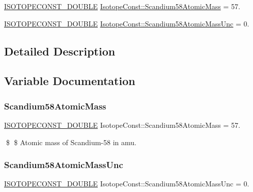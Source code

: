 \begin{DoxyCompactItemize}
\item 
\mbox{\hyperlink{group___isotope_const-_macros_ga8f45a7272ce02c0b4c65c44636ed719a}{I\+S\+O\+T\+O\+P\+E\+C\+O\+N\+S\+T\+\_\+\+D\+O\+U\+B\+LE}} \mbox{\hyperlink{group___isotope_const-_scandium-_sc58_ga1dbbfe5cc5ccc814f29a03872e4cf529}{Isotope\+Const\+::\+Scandium58\+Atomic\+Mass}} = 57.
\item 
\mbox{\hyperlink{group___isotope_const-_macros_ga8f45a7272ce02c0b4c65c44636ed719a}{I\+S\+O\+T\+O\+P\+E\+C\+O\+N\+S\+T\+\_\+\+D\+O\+U\+B\+LE}} \mbox{\hyperlink{group___isotope_const-_scandium-_sc58_ga3806395cabb2aea7ebae7f1a0381dda7}{Isotope\+Const\+::\+Scandium58\+Atomic\+Mass\+Unc}} = 0.
\end{DoxyCompactItemize}


\subsection{Detailed Description}


\subsection{Variable Documentation}
\mbox{\label{group___isotope_const-_scandium-_sc58_ga1dbbfe5cc5ccc814f29a03872e4cf529}} 
\subsubsection{\texorpdfstring{Scandium58\+Atomic\+Mass}{Scandium58AtomicMass}}
{\footnotesize\ttfamily \mbox{\hyperlink{group___isotope_const-_macros_ga8f45a7272ce02c0b4c65c44636ed719a}{I\+S\+O\+T\+O\+P\+E\+C\+O\+N\+S\+T\+\_\+\+D\+O\+U\+B\+LE}} Isotope\+Const\+::\+Scandium58\+Atomic\+Mass = 57.}

\$ \$ Atomic mass of Scandium-\/58 in amu. \mbox{\label{group___isotope_const-_scandium-_sc58_ga3806395cabb2aea7ebae7f1a0381dda7}} 
\subsubsection{\texorpdfstring{Scandium58\+Atomic\+Mass\+Unc}{Scandium58AtomicMassUnc}}
{\footnotesize\ttfamily \mbox{\hyperlink{group___isotope_const-_macros_ga8f45a7272ce02c0b4c65c44636ed719a}{I\+S\+O\+T\+O\+P\+E\+C\+O\+N\+S\+T\+\_\+\+D\+O\+U\+B\+LE}} Isotope\+Const\+::\+Scandium58\+Atomic\+Mass\+Unc = 0.}


